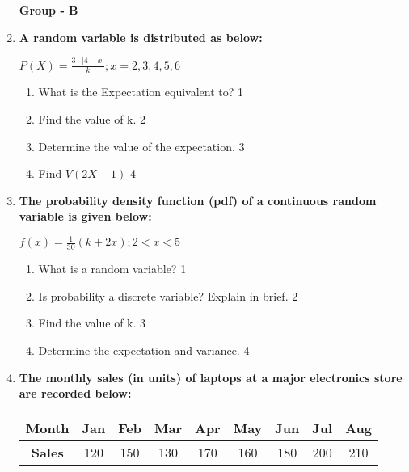 \documentclass[12pt]{article}
\begin{document}
\begin{enumerate}
  
  \begin{center}
\textbf{Group  - B}
\end{center}

          \item \textbf{A random variable is distributed as below:}
        
        \begin{center}
$\displaystyle P(X) = \frac{3-\vert 4-x\vert}{k}; x=2,3,4,5,6$
  \end{center}

  \begin{enumerate}
    \item
	What is the Expectation equivalent to? \hfill 1
    \item
    	Find the value of k. \hfill 2
    \item
    	Determine the value of the expectation. \hfill 3
     \item
     	Find $V(2X-1)$ \hfill 4
  \end{enumerate}

       \item \textbf{The probability density function (pdf) of a continuous random variable is given below:}
	  
	  \begin{center}
	  $\displaystyle f(x) = \frac{1}{30} (k+2x); 2 < x < 5$
	  \end{center}
  
  \begin{enumerate}
    \item
    What is a random variable? \hfill 1
    \item
		Is probability a discrete variable? Explain in brief. \hfill 2
    \item  
	Find the value of k.  \hfill 3
    \item
	Determine the expectation and variance. \hfill 4
  \end{enumerate}

  \item
\textbf{The monthly sales (in units) of laptops at a major electronics store are recorded below:} 

\begin{table}[H]
\centering
\begin{tabular}{c|cccccccc}
\textbf{Month} & Jan & Feb & Mar & Apr & May & Jun & Jul & Aug \\ \hline
\textbf{Sales} & 120 & 150 & 130 & 170 & 160 & 180 & 200 & 210
\end{tabular}
\end{table}


\end{enumerate}
\end{document}
